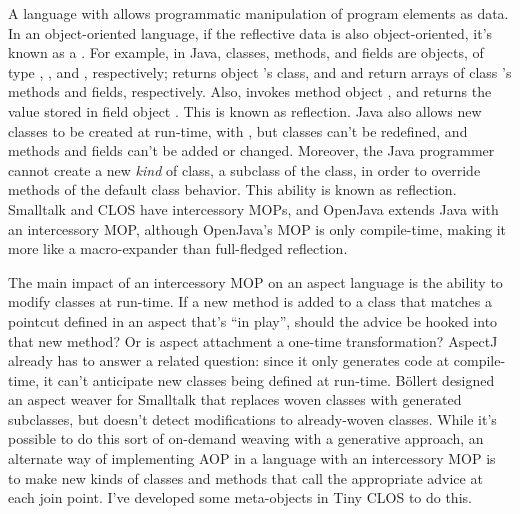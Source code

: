 \documentclass[12pt]{article}
\begin{document}
A language with  allows programmatic manipulation of
program elements as data.  In an object-oriented language, if
the reflective data is also object-oriented, it's known as a
.  For example, in Java, classes,
methods, and fields are objects, of type , ,
and , respectively;  returns object
's class, and  and 
return arrays of class 's methods and fields, respectively.
Also,  invokes method object , and
 returns the value stored in field object .
This is known as  reflection.
Java also allows new classes to be created at run-time, with
, but classes can't be redefined, and 
methods and fields can't be added or changed.  Moreover, the Java
programmer cannot create a new \emph{kind} of class, a subclass of the
 class, in order to override methods of the default class
behavior.  This ability is known as  reflection.
Smalltalk \cite{Smalltalk} and CLOS \cite{AMOP} have intercessory
MOPs, and OpenJava \cite{OpenJava} extends Java with an intercessory
MOP, although OpenJava's MOP is only compile-time, making it more like
a macro-expander than full-fledged reflection.

The main impact of an intercessory MOP on an aspect language is the
ability to modify classes at run-time.  If a new method is added to a
class that matches a pointcut defined in an aspect that's ``in play'', 
should the advice be hooked into that new method?  Or is aspect
attachment a one-time transformation?  AspectJ already has to answer
a related question: since it only generates code at compile-time, it
can't anticipate new classes being defined at run-time.  B\"ollert
\cite{AOP-ST} designed an aspect weaver for Smalltalk that 
replaces woven classes with generated subclasses, but doesn't detect
modifications to already-woven classes.  While it's possible to do
this sort of on-demand weaving with a generative approach, an
alternate way of implementing AOP in a language with an intercessory
MOP is to make new kinds of classes and methods that call the
appropriate advice at each join point.  I've developed some
meta-objects in Tiny CLOS \cite{tiny-clos} to do this.
\end{document}
